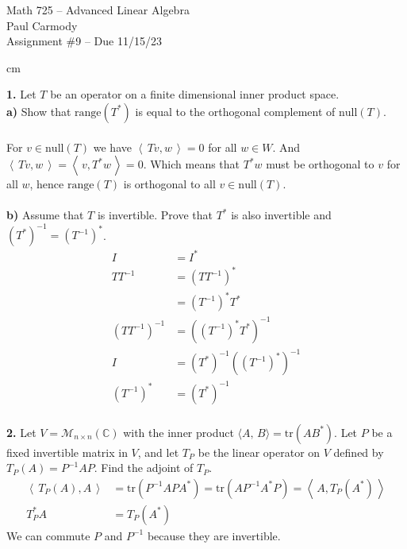 \documentclass[11pt]{amsart}
\theoremstyle{definition}  %
\newcommand{\C}{\mathbb{C}}
\newcommand{\range}{\mathrm{range}}
\newcommand{\NULL}{\mathrm{null}}
\newcommand{\IP}[1]{\left \langle\, #1 \,\right \rangle}
\newcommand{\trace}{\mathrm{tr}}
\begin{document}
\begin{center}
\Large{Math 725 -- Advanced Linear Algebra}\\
\large{Paul Carmody}\\
Assignment \#9 -- Due 11/15/23
\end{center}

 cm

\noindent
{\bf 1.} Let $T$ be an operator on a finite dimensional inner product space. \\
{\bf a)} Show that $\mathrm{range} (T^*)$ is equal to the orthogonal complement of $\mathrm{null}(T)$. \\
\\
For $v \in \NULL(T)$ we have $\IP{Tv,w}=0$ for all $w \in W$.  And $\IP{Tv,w} = \IP{v,T^*w} =0$.  Which means that $T^*w$ must be orthogonal to $v$ for all $w$, hence $\range(T)$ is orthogonal to all $v \in \NULL(T)$.\\
\\
{\bf b)} Assume that $T$ is invertible. Prove that $T^*$ is also invertible and $(T^*)^{-1} = (T^{-1})^*$. \\
\begin{align*}
	I &= I^*\\
	TT^{-1} &= (TT^{-1})^* \\
	&= (T^{-1})^*T^*\\
	(TT^{-1})^{-1} &= ((T^{-1})^*T^*)^{-1}\\
	I &= (T^*)^{-1}((T^{-1})^*)^{-1} \\
	(T^{-1})^* &= (T^*)^{-1}\\
\end{align*}


\vskip 0.1cm
\noindent
{\bf 2.} Let $V = {\mathcal M}_{n \times n}(\C)$  with the inner product $\langle A, \, B \rangle = \mathrm{tr}(AB^*)$. Let $P$ be a fixed invertible matrix in $V$, and let $T_P$ be the linear operator on $V$ defined by $T_P(A) = P^{-1} A P$. Find the adjoint of $T_P$. \\
\begin{align*}
	\IP{T_P(A),A} &= \trace(P^{-1}APA^*) = \trace(AP^{-1}A^*P) = \IP{A, T_P(A^*)}\\
	T_P^*{A} &= T_P(A^*)
\end{align*}We can commute $P$ and $P^{-1}$ because they are invertible.
\\
\end{document}

